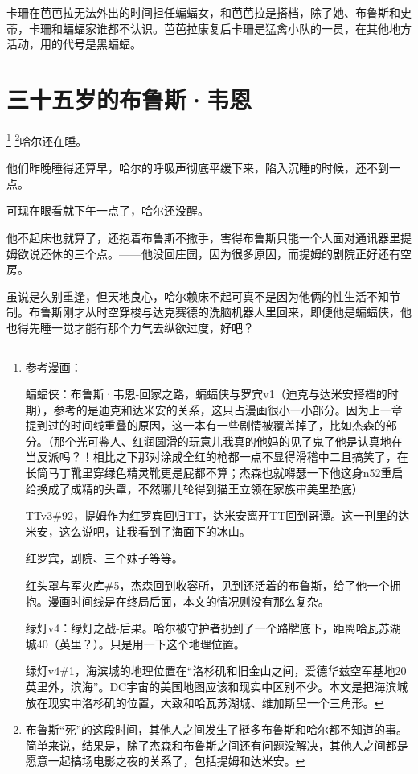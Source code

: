 \documentclass[../main]{subfiles}
\begin{document}
卡珊在芭芭拉无法外出的时间担任蝙蝠女，和芭芭拉是搭档，除了她、布鲁斯和史蒂，卡珊和蝙蝠家谁都不认识。芭芭拉康复后卡珊是猛禽小队的一员，在其他地方活动，用的代号是黑蝙蝠。


\section{三十五岁的布鲁斯·韦恩}

\footnote[1]{参考漫画：

    蝙蝠侠：布鲁斯·韦恩-回家之路，蝙蝠侠与罗宾v1（迪克与达米安搭档的时期），参考的是迪克和达米安的关系，这只占漫画很小一小部分。因为上一章提到过的时间线重叠的原因，这一本有一些剧情被覆盖掉了，比如杰森的部分。（那个光可鉴人、红润圆滑的玩意儿我真的他妈的见了鬼了他是认真地在当反派吗？！相比之下那对涂成全红的枪都一点不显得滑稽中二且搞笑了，在长筒马丁靴里穿绿色精灵靴更是屁都不算；杰森也就嘚瑟一下他这身n52重启给换成了成精的头罩，不然哪儿轮得到猫王立领在家族审美里垫底）

    TTv3\#92，提姆作为红罗宾回归TT，达米安离开TT回到哥谭。这一刊里的达米安，这么说吧，让我看到了海面下的冰山。

    红罗宾，剧院、三个妹子等等。

    红头罩与军火库\#5，杰森回到收容所，见到还活着的布鲁斯，给了他一个拥抱。漫画时间线是在终局后面，本文的情况则没有那么复杂。

    绿灯v4：绿灯之战-后果。哈尔被守护者扔到了一个路牌底下，距离哈瓦苏湖城40（英里？）。只是用一下这个地理位置。

    绿灯v4\#1，海滨城的地理位置在“洛杉矶和旧金山之间，爱德华兹空军基地20英里外，滨海”。DC宇宙的美国地图应该和现实中区别不少。本文是把海滨城放在现实中洛杉矶的位置，大致和哈瓦苏湖城、维加斯呈一个三角形。}
\footnote[2]{布鲁斯“死”的这段时间，其他人之间发生了挺多布鲁斯和哈尔都不知道的事。简单来说，结果是，除了杰森和布鲁斯之间还有问题没解决，其他人之间都是愿意一起搞场电影之夜的关系了，包括提姆和达米安。}哈尔还在睡。

他们昨晚睡得还算早，哈尔的呼吸声彻底平缓下来，陷入沉睡的时候，还不到一点。

可现在眼看就下午一点了，哈尔还没醒。

他不起床也就算了，还抱着布鲁斯不撒手，害得布鲁斯只能一个人面对通讯器里提姆欲说还休的三个点。——他没回庄园，因为很多原因，而提姆的剧院正好还有空房。

虽说是久别重逢，但天地良心，哈尔赖床不起可真不是因为他俩的性生活不知节制。布鲁斯刚才从时空穿梭与达克赛德的洗脑机器人里回来，即便他是蝙蝠侠，他也得先睡一觉才能有那个力气去纵欲过度，好吧？
\end{document}
